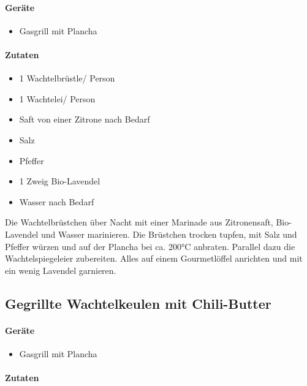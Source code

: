 \paragraph{Geräte}

\begin{itemize}[noitemsep]
	\item Gasgrill mit Plancha
\end{itemize}
	
\paragraph{Zutaten}

\begin{itemize}[noitemsep]
	\item 1 Wachtelbrüstle/ Person
	\item 1 Wachtelei/ Person
	\item Saft von einer Zitrone nach Bedarf
	\item Salz
	\item Pfeffer
	\item 1 Zweig Bio-Lavendel
	\item Wasser nach Bedarf
\end{itemize}

Die Wachtelbrüstchen über Nacht mit einer Marinade aus Zitronensaft, Bio-Lavendel und Wasser marinieren. Die Brüstchen trocken tupfen, mit 
Salz und Pfeffer würzen und  auf der Plancha bei ca. 200°C anbraten. Parallel dazu die Wachtelspiegeleier zubereiten. Alles auf einem 
Gourmetlöffel anrichten und mit ein wenig Lavendel garnieren.

\subsection{ Gegrillte Wachtelkeulen mit Chili-Butter }

\paragraph{Geräte}

\begin{itemize}[noitemsep]
	\item Gasgrill mit Plancha
\end{itemize}

\paragraph{Zutaten}

